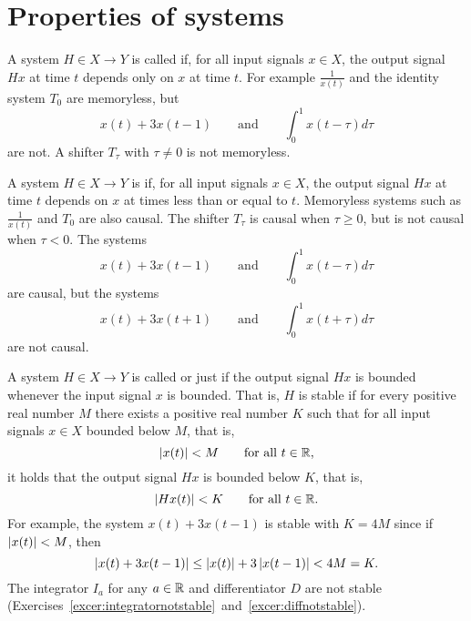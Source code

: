 




\section{Properties of systems}\label{sec:properties-systems}


A system $H \in X \to Y$ is called  if, for all input signals $x \in X$, the output signal $Hx$ at time $t$ depends only on $x$ at time $t$.  For example $\frac{1}{x(t)}$ and the identity system $T_0$ are memoryless, but 
\[
x(t) + 3 x(t-1) \qquad \text{and} \qquad \int_{0}^{1} x(t - \tau) d\tau
\] 
are not.  A shifter $T_\tau$ with $\tau \neq 0$ is not memoryless.

A system $H \in X \to Y$ is  if, for all input signals $x \in X$, the output signal $Hx$ at time $t$ depends on $x$ at times less than or equal to $t$.  Memoryless systems such as $\frac{1}{x(t)}$ and $T_0$ are also causal.  The shifter $T_\tau$ is causal when $\tau \geq 0$, but is not causal when $\tau < 0$.  The systems 
\[
x(t) + 3 x(t-1) \qquad \text{and} \qquad \int_{0}^{1} x(t - \tau) d\tau
\] 
are causal, but the systems 
\[
x(t) + 3 x(t+1) \qquad \text{and} \qquad \int_{0}^{1} x(t + \tau) d\tau
\] 
are not causal.

A system $H \in X \to Y$ is called  or just  if the output signal $Hx$ is bounded whenever the input signal $x$ is bounded.  That is, $H$ is stable if for every positive real number $M$ there exists a positive real number $K$ such that for all input signals $x \in X$ bounded below $M$, that is,
\[
\left\vert x(t) \right\vert < M \qquad \text{for all $t\in{\mathbb R}$},
\] 
it holds that the output signal $Hx$ is bounded below $K$, that is,
\[
\left\vert Hx(t) \right\vert < K \qquad \text{for all $t\in{\mathbb R}$}.
\]
For example, the system $x(t) + 3 x(t-1)$ is stable with $K = 4M$ since if $\left\vert x(t) \right\vert < M$, then 
\[
\left\vert x(t) + 3 x(t-1) \right\vert \leq \left\vert x(t) \right\vert + 3 \left\vert x(t-1) \right\vert < 4 M = K.
\]
The integrator $I_a$ for any $a \in {\mathbb R}$ and differentiator $D$ are not stable (Exercises~\ref{excer:integratornotstable}~and~\ref{excer:diffnotstable}).


